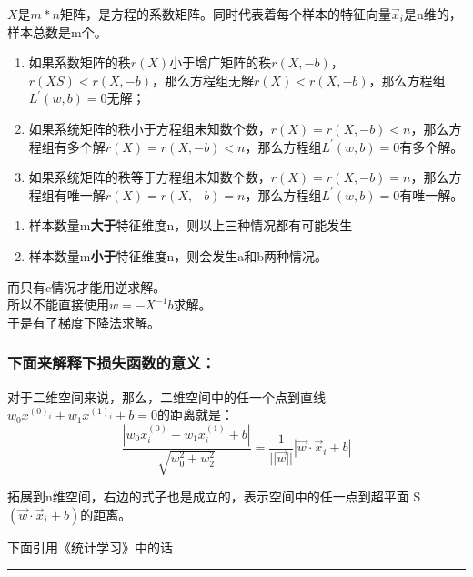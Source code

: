 \documentclass[11pt]{article}
\providecommand{\tightlist}{%
      \setlength{\itemsep}{0pt}\setlength{\parskip}{0pt}}
\begin{document}
\(X\)是\(m*n矩阵\)，是方程的系数矩阵。同时代表着每个样本的特征向量\(\vec x_i\)是n维的，样本总数是m个。

\begin{enumerate}
\def\labelenumi{\alph{enumi}.}
\tightlist
\item
  如果系数矩阵的秩\(r(X)\)小于增广矩阵的秩\(r(X,-b)\)，\(r(XS)<r(X,-b)\)，那么方程组无解\(r(X)<r(X,-b)\)，那么方程组\(L^{'}(w, b)=0\)无解；\\
\item
  如果系统矩阵的秩小于方程组未知数个数，\(r(X)=r(X,-b)<n\)，那么方程组有多个解\(r(X)=r(X,-b)<n\)，那么方程组\(L^{'}(w, b)=0\)有多个解。\\
\item
  如果系统矩阵的秩等于方程组未知数个数，\(r(X)=r(X,-b)=n\)，那么方程组有唯一解\(r(X)=r(X,-b)=n\)，那么方程组\(L^{'}(w, b)=0\)有唯一解。
\end{enumerate}

\begin{enumerate}
\def\labelenumi{\arabic{enumi}.}
\tightlist
\item
  样本数量m\textbf{大于}特征维度n，则以上三种情况都有可能发生
\item
  样本数量m\textbf{小于}特征维度n，则会发生a和b两种情况。
\end{enumerate}

而只有c情况才能用逆求解。\\
所以不能直接使用\(w = -{X}^{-1}{b}\)求解。\\
于是有了梯度下降法求解。

    \hypertarget{ux4e0bux9762ux6765ux89e3ux91caux4e0bux635fux5931ux51fdux6570ux7684ux610fux4e49}{%
\subsubsection{下面来解释下损失函数的意义：}\label{ux4e0bux9762ux6765ux89e3ux91caux4e0bux635fux5931ux51fdux6570ux7684ux610fux4e49}}

对于二维空间来说，那么，二维空间中的任一个点到直线\(w_0 x^{(0)_i} + w_1 x^{(1)_i} + b = 0\)的距离就是：
\[\frac{|w_0 x^{(0)}_i + w_1 x^{(1)}_i + b|}{\sqrt{w_0^2 + w_2^2}}=\frac{1}{||\vec w||} |\vec w \cdot \vec x_i + b|\]

拓展到n维空间，右边的式子也是成立的，表示空间中的任一点到超平面
S\((\vec w \cdot \vec x_i + b)\)的距离。

    下面引用《统计学习》中的话

\begin{center}\rule{0.5\linewidth}{\linethickness}\end{center}
\end{document}
